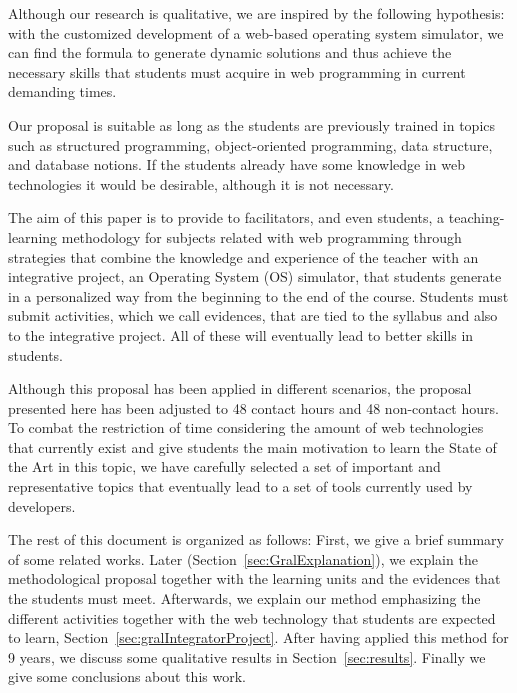 Although our research is qualitative, we are inspired by the following hypothesis: 
with the customized development of a web-based operating system simulator, we can 
find the formula to generate dynamic solutions and thus achieve the necessary skills 
that students must acquire in web programming in current demanding times.

Our proposal is suitable as long as the students are previously trained in topics 
such as structured programming, object-oriented programming, data structure, and database 
notions. If the students already have some knowledge in web technologies it would be 
desirable, although it is not necessary.

The aim of this paper is to provide to facilitators, and even students, 
a teaching-learning methodology for subjects related with web programming through 
strategies that combine the knowledge and experience of the teacher with an 
integrative project, an Operating System (OS) simulator, that students generate in a 
personalized way from the beginning to the end of the course. 
Students must submit activities, which we call evidences, that are tied to the  
syllabus and also to the integrative project. 
All of these will eventually lead to better skills in students.

Although this proposal has been applied in different scenarios, the proposal 
presented here has been adjusted to 48 contact hours and 48 non-contact hours. 
To combat the restriction of time considering the amount of web technologies that 
currently exist and give students the main motivation to learn the State of the Art 
in this topic, we have carefully selected a set of important and representative topics 
that eventually lead to a set of tools currently used by developers.

The rest of this document is organized as follows: 
First, we give a brief summary of some related works.
Later (Section~\ref{sec:GralExplanation}), we explain the methodological proposal 
    together with the learning units and the evidences that the students must meet.
Afterwards, we explain our method emphasizing the different activities together with 
    the web technology that students are expected to learn, 
    Section~\ref{sec:gralIntegratorProject}. 
After having applied this method for 9 years, we discuss some qualitative results in 
    Section~\ref{sec:results}.
Finally we give some conclusions about this work.


